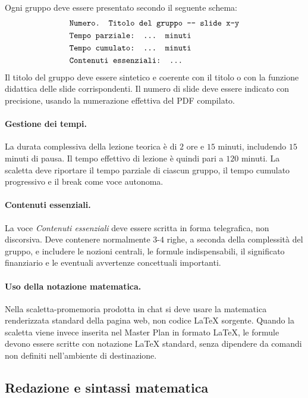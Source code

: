 \documentclass[12pt,a4paper]{article}%
\newcommand{\1}{\mathbf{1}}
\begin{document}
Ogni gruppo deve essere presentato secondo il seguente schema:
\[%
\begin{array}
[c]{l}%
\mbox{\texttt{Numero. Titolo del gruppo --- slide x-y}}\\[3pt]%
\mbox{\texttt{Tempo parziale: ... minuti}}\\[3pt]%
\mbox{\texttt{Tempo cumulato: ... minuti}}\\[3pt]%
\mbox{\texttt{Contenuti essenziali: ...}}
\end{array}
\]
Il titolo del gruppo deve essere sintetico e coerente con il titolo o con la
funzione didattica delle slide corrispondenti. Il numero di slide deve essere
indicato con precisione, usando la numerazione effettiva del PDF compilato.

\paragraph{Gestione dei tempi.}

La durata complessiva della lezione teorica \`{e} di $2$ ore e $15$ minuti,
includendo $15$ minuti di pausa. Il tempo effettivo di lezione \`{e} quindi
pari a $120$ minuti. La scaletta deve riportare il tempo parziale di ciascun
gruppo, il tempo cumulato progressivo e il break come voce autonoma.

\paragraph{Contenuti essenziali.}

La voce \emph{Contenuti essenziali} deve essere scritta in forma telegrafica,
non discorsiva. Deve contenere normalmente $3$-$4$ righe, a seconda della
complessit\`{a} del gruppo, e includere le nozioni centrali, le formule
indispensabili, il significato finanziario e le eventuali avvertenze
concettuali importanti.

\paragraph{Uso della notazione matematica.}

Nella scaletta-promemoria prodotta in chat si deve usare la matematica
renderizzata standard della pagina web, non codice LaTeX sorgente. Quando la
scaletta viene invece inserita nel Master Plan in formato LaTeX, le formule
devono essere scritte con notazione LaTeX standard, senza dipendere da comandi
non definiti nell'ambiente di destinazione.

\subsection{Redazione e sintassi matematica}
\end{document}
